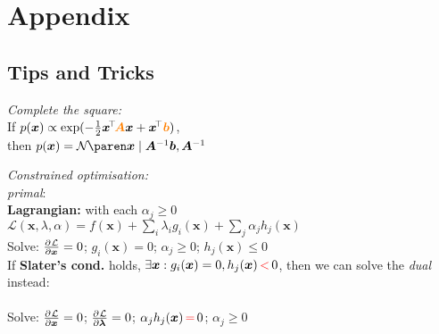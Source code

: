 \section{Appendix}

\subsection{Tips and Tricks}

\emph{Complete the square:}
\\
If $p(\bm x) \propto \exp(-\frac12 \bm x\!^\top \!\bm{{\color{orange} A}x} + \bm x\!^\top {\color{orange} \bm b})$,\\
then $p(\bm x) = \Gauss{\bm x \mid \bm A^{-1} \bm b, \bm A^{-1}}$

\emph{Constrained optimisation:}
\\
\textit{primal}: \enspace {}
\\
\textbf{Lagrangian:} \enspace with each $\alpha_j \geq 0$\\
\enspace $\mathcal L(\bm x,\lambda,\alpha) = f(\bm x) + \sum_i \lambda_i g_i(\bm x) + \sum_j \alpha_j h_j(\bm x)$
\\
Solve: \: $\pderiv{\mathcal L}{\bm x} = 0$; \: $g_i(\bm x) = 0$; \: $\alpha_j \geq 0$; \: $h_j(\bm x) \leq 0$
\\
If \textbf{Slater's cond.} holds, $\exists \bm x : g_i(\bm x) = 0, h_j(\bm x) {\color{red}\,<\,} 0$, then we can solve the \textit{dual} instead:\\
\enskip {}\\
Solve: \: $\pderiv{\mathcal L}{\bm x} = 0$; \: $\pderiv{\mathcal L}{\bm \lambda} = 0$; \: $\alpha_j h_j(\bm x) {\color{red}\,=\,} 0$; \: $\alpha_j \geq 0$

\iffalse
    \emph{Lagrange Multipliers:}
    \\
    Problem $\mathcal P : \begin{cases}
        \min f(\bm x),      & \bm x\in\mathbb R^d \\
        \text{s.t. } g_i(\bm x)=0,      & i\leq m \\
        \phantom{\text{s.t. }} h_j(\bm x) \leq 0,       & j\leq n
    \end{cases}$
    \\
    Lagrangian: $\mathcal L(\bm x,\lambda,\alpha) = f(\bm x) + \sum_{i\leq m} \lambda_i g_i(\bm x) + \sum_{j\leq n} \alpha_j h_j(\bm x)$ with each $\alpha_j \geq 0$.
    \\
    Solution must satisfy
    $\pderiv{\mathcal L}{\bm x} = 0$ and $\pderiv{\mathcal L}{\lambda} = 0$,
    $\alpha_j h_j(\bm x) = 0$, and
    $\alpha_j \geq 0, \forall j\leq n$.
\fi

